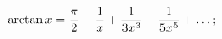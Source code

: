 \[\mathop{\mathrm{arctan}\/}\nolimits x=\frac{\pi}{2}-\frac{1}{x}+\frac{1}{3x^{3%
}}-\frac{1}{5x^{5}}+\dots;\]